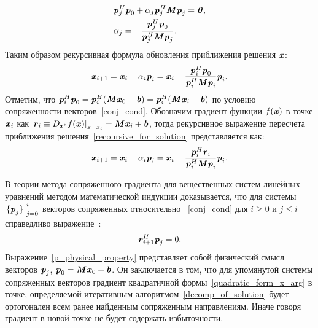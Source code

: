 \begin{align}
	&\textbf{\textit{p}}^H_j\textbf{\textit{p}}_0+\alpha_j\textbf{\textit{p}}_j^H\textbf{\textit{M}}\textbf{\textit{p}}_j=\textbf{\textit{0}}, \\
	&\alpha_j=-\frac{\textbf{\textit{p}}^H_j\textbf{\textit{p}}_0}{\textbf{\textit{p}}_j^H\textbf{\textit{M}}\textbf{\textit{p}}_j}.
	\label{tmp_equation_zero_cond}
\end{align}
Таким образом рекурсивная формула обновления приближения решения $\textbf{\textit{x}}$:
\begin{equation}
	\textbf{\textit{x}}_{i+1}=\textbf{\textit{x}}_{i}+\alpha_{i}\textbf{\textit{p}}_{i}=\textbf{\textit{x}}_{i}-\frac{\textbf{\textit{p}}^H_{i}\textbf{\textit{p}}_0}{\textbf{\textit{p}}_{i}^H\textbf{\textit{M}}\textbf{\textit{p}}_{i}}\textbf{\textit{p}}_{i}.
	\label{recoursive_for_solution}
\end{equation}
Отметим, что $\textbf{\textit{p}}^H_{i}\textbf{\textit{p}}_0=\textbf{\textit{p}}^H_{i}(\textbf{\textit{M}}\textbf{\textit{x}}_0+\textbf{\textit{b}})=\textbf{\textit{p}}^H_{i}(\textbf{\textit{M}}\textbf{\textit{x}}_i+\textbf{\textit{b}})$ по условию сопряженности векторов~\eqref{conj_cond}. Обозначим градиент функции $f(\textbf{\textit{x}})$ в точке $\textbf{\textit{x}}_i$ как $\left.\textbf{\textit{r}}_i\equiv D_{\textbf{\textit{x}}^*}f(\textbf{\textit{x}}) \right|_{\textbf{\textit{x}}=\textbf{\textit{x}}_i}=\textbf{\textit{M}}\textbf{\textit{x}}_i+\textbf{\textit{b}}$, тогда рекурсивное выражение пересчета приближения решения~\eqref{recoursive_for_solution} представляется как:
\begin{equation}
	\textbf{\textit{x}}_{i+1}=\textbf{\textit{x}}_{i}+\alpha_{i}\textbf{\textit{p}}_{i}=\textbf{\textit{x}}_{i}-\frac{\textbf{\textit{p}}^H_{i}\textbf{\textit{r}}_i}{\textbf{\textit{p}}_{i}^H\textbf{\textit{M}}\textbf{\textit{p}}_{i}}\textbf{\textit{p}}_{i}.
	\label{recoursive_for_solution_modified}
\end{equation}

В теории метода сопряженного градиента для вещественных систем линейных уравнений методом математической индукции доказывается, что для системы $\left. \{\textbf{\textit{p}}_j\} \right|_{j=0}^{i}$ векторов сопряженных относительно ~\eqref{conj_cond} для $i\geqslant 0$ и $j\leqslant i$ справедливо выражение~\cite{HestenesStiefel1952}:
\begin{equation}
	\textbf{\textit{r}}_{i+1}^H\textbf{\textit{p}}_j=0.
	\label{p_physical_property}
\end{equation}
Выражение~\eqref{p_physical_property} представляет собой физический смысл векторов $\textbf{\textit{p}}_j$, $\textbf{\textit{p}}_0=\textbf{\textit{M}}\textbf{\textit{x}}_0+\textbf{\textit{b}}$. Он заключается в том, что для упомянутой системы сопряженных векторов градиент квадратичной формы~\eqref{quadratic_form_x_arg} в точке, определяемой итеративным алгоритмом~\eqref{decomp_of_solution} будет ортогонален всем ранее найденным сопряженным направлениям. Иначе говоря градиент в новой точке не будет содержать избыточности.

